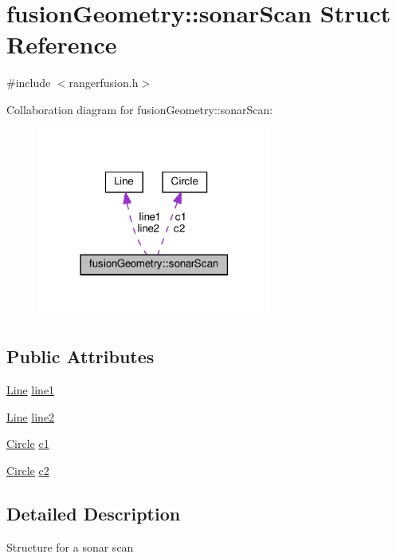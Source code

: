 \hypertarget{structfusionGeometry_1_1sonarScan}{}\section{fusion\+Geometry\+:\+:sonar\+Scan Struct Reference}
\label{structfusionGeometry_1_1sonarScan}


{\ttfamily \#include $<$rangerfusion.\+h$>$}



Collaboration diagram for fusion\+Geometry\+:\+:sonar\+Scan\+:\nopagebreak
\begin{figure}[H]
\begin{center}
\leavevmode
\includegraphics[width=218pt]{structfusionGeometry_1_1sonarScan__coll__graph}
\end{center}
\end{figure}
\subsection*{Public Attributes}
\begin{DoxyCompactItemize}
\item 
\hyperlink{classLine}{Line} \hyperlink{structfusionGeometry_1_1sonarScan_a5f7f2a2cbf85f169c286d2ec1455e3c8}{line1}
\item 
\hyperlink{classLine}{Line} \hyperlink{structfusionGeometry_1_1sonarScan_afb325a62186cf1333025c6bcda04bb36}{line2}
\item 
\hyperlink{classCircle}{Circle} \hyperlink{structfusionGeometry_1_1sonarScan_a21c1254ebacf46d3f3052469417534e9}{c1}
\item 
\hyperlink{classCircle}{Circle} \hyperlink{structfusionGeometry_1_1sonarScan_a6ad2411596ebd31d89123affef6930c7}{c2}
\end{DoxyCompactItemize}


\subsection{Detailed Description}
Structure for a sonar scan 

